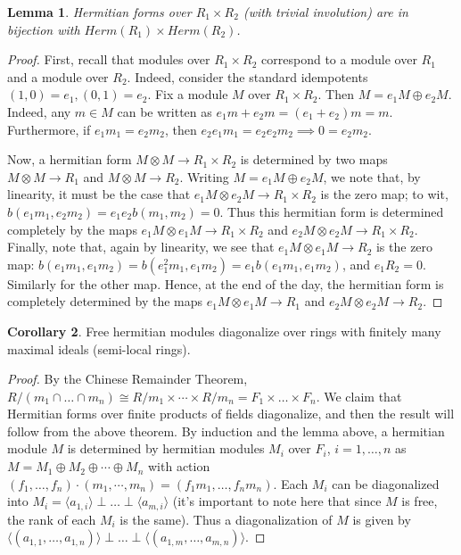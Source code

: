 \documentclass[draftthesis,tocnosub,noragright,centerchapter,10pt]{uiucthesis2009}
\theoremstyle{plain}
\newtheorem{lemma}{Lemma}
\theoremstyle{definition}
\newtheorem{corollary}[lemma]{Corollary}
\begin{document}
\begin{lemma}
Hermitian forms over $R_1 \times R_2$ (with trivial involution) are in bijection with $Herm(R_1)
\times Herm(R_2)$.
\end{lemma}

\begin{proof}
First, recall that modules over $R_1 \times R_2$ correspond to a
module over $R_1$ and a module over $R_2$. Indeed, consider the
standard idempotents $(1,0) = e_1, (0,1) = e_2$. Fix a module $M$ over
$R_1 \times R_2$. Then $M = e_1M \oplus e_2M$. Indeed, any $m \in M$
can be written as $e_1m + e_2m = (e_1+e_2)m = m$. Furthermore, if
$e_1m_1 = e_2m_2$, then $e_2e_1m_1=e_2e_2m_2 \implies 0 = e_2m_2$. 

Now, a hermitian form $M \otimes M \rightarrow R_1 \times R_2$ is
determined by two maps $M \otimes M \rightarrow R_1$ and $M \otimes M
\rightarrow R_2$. Writing $M = e_1M \oplus e_2M$, we note that, by
linearity, it must be the case that $e_1M \otimes e_2M \rightarrow R_1
\times R_2$ is the zero map; to wit, $b(e_1m_1,e_2m_2) =
e_1e_2b(m_1,m_2) = 0$. Thus this hermitian form is determined
completely by the maps $e_1M \otimes e_1M \rightarrow R_1 \times R_2$
and $e_2M \otimes e_2M \rightarrow R_1 \times R_2$. Finally, note
that, again by linearity, we see that $e_1M \otimes e_1M \rightarrow
R_2$ is the zero map: $b(e_1m_1,e_1m_2) = b(e_1^2m_1,e_1m_2) =
e_1b(e_1m_1,e_1m_2)$, and $e_1R_2 = 0$. Similarly for the other
map. Hence, at the end of the day, the hermitian form is completely
determined by the maps $e_1M \otimes e_1M \rightarrow R_1$ and $e_2M
\otimes e_2M \rightarrow R_2$. 
\end{proof}

\begin{corollary}
Free hermitian modules diagonalize over rings with finitely many maximal
ideals (semi-local rings).
\end{corollary}

\begin{proof}
By the Chinese Remainder Theorem, $R/(m_1 \cap \dots \cap m_n) \cong
R/m_1 \times \cdots \times R/m_n = F_1 \times \dots \times F_n$. We
claim that Hermitian forms over finite products of fields
diagonalize, and then the result will follow from the above theorem. By induction and the lemma above, a hermitian module $M$
is determined by hermitian modules $M_i$ over $F_i$, $i =
1,\dots,n$ as $M = M_1 \oplus M_2 \oplus \cdots \oplus M_n$ with
action $(f_1,\dots,f_n) \cdot (m_1,\cdots,m_n) =
(f_1m_1,\dots,f_nm_n)$. Each $M_i$ can be diagonalized into $M_i = \langle a_{1,i}
\rangle \perp \dots \perp \langle a_{m,i}\rangle$ (it's important to
note here that since $M$ is free, the rank of each $M_i$ is the same). Thus a
diagonalization of $M$ is given by $\langle (a_{1,1},\dots,a_{1,n})
\rangle \perp \dots \perp \langle (a_{1,m},
\dots,a_{m,n})\rangle$. 
\end{proof}
\end{document}
